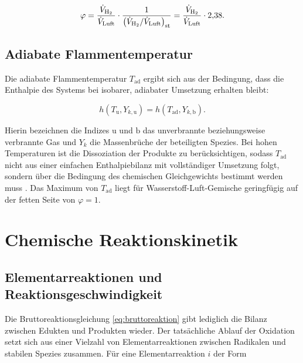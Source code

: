 \begin{equation}
	\label{eq:phi_volumen}
	\varphi = \frac{\dot{V}_{\ce{H2}}}{\dot{V}_\mathrm{Luft}}
	          \cdot \frac{1}{\left(\dot{V}_{\ce{H2}}/\dot{V}_\mathrm{Luft}\right)_\mathrm{st}}
	        = \frac{\dot{V}_{\ce{H2}}}{\dot{V}_\mathrm{Luft}} \cdot 2{,}38.
\end{equation}

\subsection{Adiabate Flammentemperatur}\label{subsec:adiabat}

Die adiabate Flammentemperatur $T_\mathrm{ad}$ ergibt sich aus der Bedingung,
dass die Enthalpie des Systems bei isobarer, adiabater Umsetzung erhalten
bleibt:

\begin{equation}
	\label{eq:adiabat}
	h\!\left(T_\mathrm{u}, Y_{k,\mathrm{u}}\right)
	= h\!\left(T_\mathrm{ad}, Y_{k,\mathrm{b}}\right).
\end{equation}

Hierin bezeichnen die Indizes $\mathrm{u}$ und $\mathrm{b}$ das unverbrannte
beziehungsweise verbrannte Gas und $Y_k$ die Massenbrüche der beteiligten
Spezies. Bei hohen Temperaturen ist die Dissoziation der Produkte zu
berücksichtigen, sodass $T_\mathrm{ad}$ nicht aus einer einfachen
Enthalpiebilanz mit vollständiger Umsetzung folgt, sondern über die Bedingung
des chemischen Gleichgewichts bestimmt werden muss \cite{Warnatz_2001}. Das
Maximum von $T_\mathrm{ad}$ liegt für Wasserstoff-Luft-Gemische geringfügig auf
der fetten Seite von $\varphi = 1$.

\section{Chemische Reaktionskinetik}\label{sec:kinetik}

\subsection{Elementarreaktionen und Reaktionsgeschwindigkeit}\label{subsec:elementarreaktionen}

Die Bruttoreaktionsgleichung \eqref{eq:bruttoreaktion} gibt lediglich die
Bilanz zwischen Edukten und Produkten wieder. Der tatsächliche Ablauf der
Oxidation setzt sich aus einer Vielzahl von Elementarreaktionen zwischen
Radikalen und stabilen Spezies zusammen. Für eine Elementarreaktion $i$ der
Form

